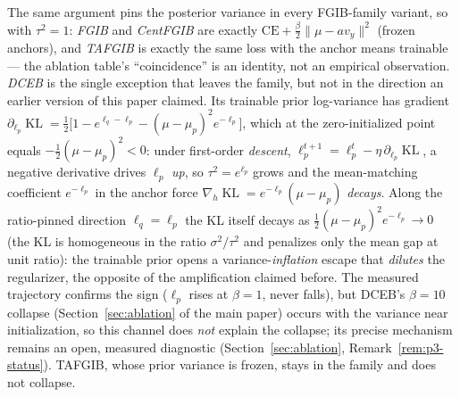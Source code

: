 \begin{corollary}\label{cor:family}
The same argument pins the posterior variance in every FGIB-family variant, so with
$\tau^2 = 1$: \emph{FGIB} and \emph{CentFGIB} are exactly
$\mathrm{CE} + \tfrac{\beta}{2}\|\mu - a v_y\|^2$ (frozen anchors), and \emph{TAFGIB} is
exactly the same loss with the anchor means trainable --- the ablation table's
``coincidence'' is an identity, not an empirical observation. \emph{DCEB} is the single
exception that leaves the family, but not in the direction an earlier version of this
paper claimed. Its trainable prior log-variance has gradient
$\partial_{\ell_p}\operatorname{KL} = \tfrac12\big[1 - e^{\ell_q-\ell_p}
- (\mu-\mu_p)^2 e^{-\ell_p}\big]$, which at the zero-initialized point equals
$-\tfrac12(\mu-\mu_p)^2 < 0$: under first-order \emph{descent},
$\ell_p^{t+1} = \ell_p^t - \eta\,\partial_{\ell_p}\operatorname{KL}$,
a negative derivative drives $\ell_p$ \emph{up}, so $\tau^2 = e^{\ell_p}$ grows and the
mean-matching coefficient $e^{-\ell_p}$ in the anchor force
$\nabla_h \operatorname{KL} = e^{-\ell_p}(\mu - \mu_p)$ \emph{decays}. Along the
ratio-pinned direction $\ell_q = \ell_p$ the KL itself decays as
$\tfrac12(\mu-\mu_p)^2 e^{-\ell_p} \to 0$ (the KL is homogeneous in the ratio
$\sigma^2/\tau^2$ and penalizes only the mean gap at unit ratio): the trainable prior
opens a variance-\emph{inflation} escape that \emph{dilutes} the regularizer, the
opposite of the amplification claimed before. The measured trajectory confirms the
sign ($\ell_p$ rises at $\beta=1$, never falls), but DCEB's $\beta=10$ collapse
(Section~\ref{sec:ablation} of the main paper) occurs with the variance near
initialization, so this channel does \emph{not} explain the collapse; its precise
mechanism remains an open, measured diagnostic (Section~\ref{sec:ablation},
Remark~\ref{rem:p3-status}). TAFGIB, whose prior variance is frozen, stays in the
family and does not collapse.
\end{corollary}


